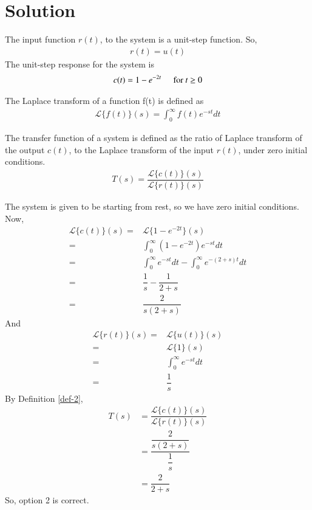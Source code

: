 \documentclass[journal,12pt,twocolumn]{IEEEtran}
\begin{document}
\section{Solution}
The input function $r(t)$, to the system is a unit-step function. So, 
\begin{align}
    r(t)=u(t)
\end{align}
The unit-step response for the system is
\begin{align}
    c(t)=1-e^{-2t} \hspace{0.5cm} \text{for} \  t\geq0 
\end{align}
\begin{definition}
The Laplace transform of a function f(t) is defined as
\begin{align}
    \mathcal{L}\{f(t)\}(s)=\int_0^\infty f(t)e^{-st}dt
\end{align}
\end{definition}
\begin{definition}\label{def-2}
The transfer function of a system is defined as the ratio of Laplace transform of the output $c(t)$, to the Laplace transform of the input $r(t)$, under zero initial conditions.
\begin{align}
    T(s)=\dfrac{\mathcal{L}\{c(t)\}(s)}{\mathcal{L}\{r(t)\}(s)}
\end{align}
\end{definition}

The system is given to be starting from rest, so we have zero initial conditions.\\
Now,
\begin{align}
    \mathcal{L}\{c(t)\}(s)=&\mathcal{L}\{1-e^{-2t}\}(s)\\
    =&\int_0^\infty(1-e^{-2t})e^{-st}dt\\
    =&\int_0^\infty e^{-st}dt - \int_0^\infty e^{-(2+s)t}dt\\
    =&\dfrac{1}{s} - \dfrac{1}{2+s}\\
    =&\dfrac{2}{s(2+s)}
\end{align}
And
\begin{align}
    \mathcal{L}\{r(t)\}(s)=&\mathcal{L}\{u(t)\}(s)\\
    =&\mathcal{L}\{1\}(s)\\
    =&\int_0^\infty e^{-st}dt\\
    =&\dfrac{1}{s}
\end{align}
By Definition \ref{def-2},
\begin{align}
    T(s)&=\dfrac{\mathcal{L}\{c(t)\}(s)}{\mathcal{L}\{r(t)\}(s)}\\
    &=\dfrac{\dfrac{2}{s(2+s)}}{\dfrac{1}{s}}\\
    &=\dfrac{2}{2+s}
\end{align}
So, option 2 is correct.
\end{document}
